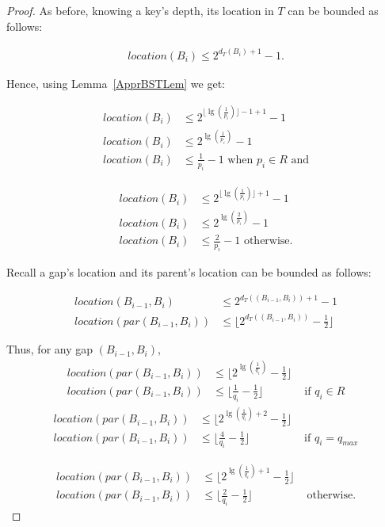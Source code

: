 \documentclass[letterpaper,12pt,titlepage,oneside,final]{book}
\theoremstyle{plain}
\begin{document}
\begin{proof}
As before, knowing a key's depth, its location in $T$ can be bounded as follows:

\begin{align*}
location(B_i) \leq 2^{d_T(B_i)+1}-1.
\end{align*}

Hence, using Lemma~\ref{ApprBSTLem} we get:

\begin{align*}
location(B_i) &\leq 2^{\lfloor \lg(\frac{1}{p_i}) \rfloor -1 +1}-1 \\
location(B_i) &\leq 2^{\lg(\frac{1}{p_i})}-1 \\
location(B_i) &\leq \frac{1}{p_i}-1 \text{ when } p_i \in R  \text{ and}
\end{align*}

\begin{align*}
location(B_i) &\leq 2^{\lfloor \lg(\frac{1}{p_i}) \rfloor +1}-1 \\
location(B_i) &\leq 2^{\lg(\frac{2}{p_i})}-1 \\
location(B_i) &\leq \frac{2}{p_i}-1 \text{ otherwise.}
\end{align*}


Recall a gap's location and its parent's location can be bounded as follows:

\begin{align*}
location(B_{i-1}, B_i) &\leq 2^{d_T((B_{i-1},B_i))+1}-1 \\
location(par(B_{i-1}, B_i)) &\leq \lfloor 2^{d_T((B_{i-1},B_i))}-\frac{1}{2} \rfloor
\end{align*}

Thus, for any gap $(B_{i-1},B_i)$,
\begin{align*}
location(par(B_{i-1},B_i)) &\leq \lfloor 2^{\lg(\frac{1}{q_i})}-\frac{1}{2} \rfloor& \\
location(par(B_{i-1},B_i)) &\leq \lfloor \frac{1}{q_i}-\frac{1}{2} \rfloor &\text{ if } q_i \in R 
\end{align*}
\begin{align*}
location(par(B_{i-1},B_i)) &\leq \lfloor 2^{\lg(\frac{1}{q_i}) + 2}-\frac{1}{2} \rfloor& \\
location(par(B_{i-1},B_i)) &\leq \lfloor \frac{4}{q_i}-\frac{1}{2} \rfloor &\text{ if } q_i = q_{max}
\end{align*}

\begin{align*}
location(par(B_{i-1},B_i)) &\leq \lfloor 2^{\lg(\frac{1}{q_i}) + 1}-\frac{1}{2} \rfloor& \\
location(par(B_{i-1},B_i)) &\leq \lfloor \frac{2}{q_i}-\frac{1}{2} \rfloor &\text{ otherwise.}
\end{align*}

\end{proof}
\end{document}
